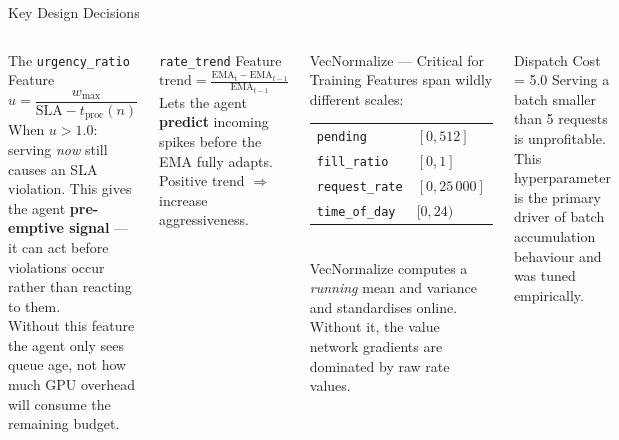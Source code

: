 \documentclass[aspectratio=169]{beamer}
\begin{document}
\begin{frame}{Key Design Decisions}
  \begin{columns}[T]
      \begin{block}{The \texttt{urgency\_ratio} Feature}
        \begin{equation*}
          u = \frac{w_{\max}}{\text{SLA} - t_\text{proc}(n)}
        \end{equation*}
        When $u > 1.0$: serving \emph{now} still causes an SLA violation.
        This gives the agent \textbf{pre-emptive signal} — it can act before
        violations occur rather than reacting to them.\\[4pt]
        Without this feature the agent only sees queue age, not how much
        GPU overhead will consume the remaining budget.
      \end{block}
      \vspace{4pt}
      \begin{block}{\texttt{rate\_trend} Feature}
        $\text{trend} = \frac{\text{EMA}_t - \text{EMA}_{t-1}}{\text{EMA}_{t-1}}$\\[4pt]
        Lets the agent \textbf{predict} incoming spikes before the EMA
        fully adapts.  Positive trend $\Rightarrow$ increase aggressiveness.
      \end{block}

      \begin{block}{VecNormalize — Critical for Training}
        Features span wildly different scales:\\[4pt]
        \begin{tabular}{@{}ll@{}}
          \texttt{pending}      & $[0, 512]$ \\
          \texttt{fill\_ratio}  & $[0, 1]$ \\
          \texttt{request\_rate}& $[0, 25\,000]$ \\
          \texttt{time\_of\_day}& $[0, 24)$ \\
        \end{tabular}\\[4pt]
        VecNormalize computes a \emph{running} mean and variance and
        standardises online.  Without it, the value network gradients
        are dominated by raw rate values.
      \end{block}
      \vspace{4pt}
      \begin{block}{Dispatch Cost = 5.0}
        Serving a batch smaller than 5 requests is unprofitable.
        This hyperparameter is the primary driver of batch accumulation
        behaviour and was tuned empirically.
      \end{block}
  \end{columns}
\end{frame}
\end{document}
